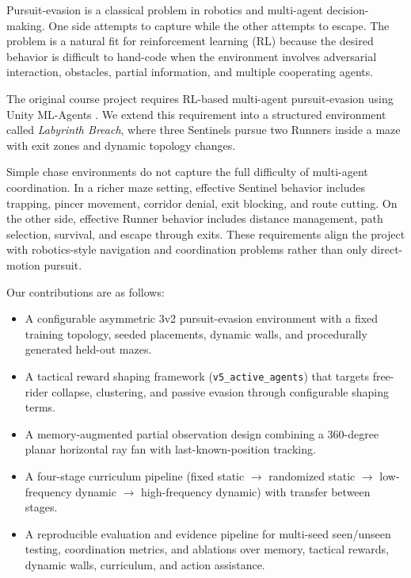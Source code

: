 \documentclass[journal]{IEEEtran}
\begin{document}
Pursuit-evasion is a classical problem in robotics and multi-agent decision-making. One side attempts to capture while the other attempts to escape. The problem is a natural fit for reinforcement learning (RL) because the desired behavior is difficult to hand-code when the environment involves adversarial interaction, obstacles, partial information, and multiple cooperating agents.

The original course project requires RL-based multi-agent pursuit-evasion using Unity ML-Agents \cite{ai641projectdoc}. We extend this requirement into a structured environment called \textit{Labyrinth Breach}, where three Sentinels pursue two Runners inside a maze with exit zones and dynamic topology changes.

Simple chase environments do not capture the full difficulty of multi-agent coordination. In a richer maze setting, effective Sentinel behavior includes trapping, pincer movement, corridor denial, exit blocking, and route cutting. On the other side, effective Runner behavior includes distance management, path selection, survival, and escape through exits. These requirements align the project with robotics-style navigation and coordination problems rather than only direct-motion pursuit.

Our contributions are as follows:
\begin{itemize}
    \item A configurable asymmetric 3v2 pursuit-evasion environment with a fixed training topology, seeded placements, dynamic walls, and procedurally generated held-out mazes.
    \item A tactical reward shaping framework (\texttt{v5\_active\_agents}) that targets free-rider collapse, clustering, and passive evasion through configurable shaping terms.
    \item A memory-augmented partial observation design combining a 360-degree planar horizontal ray fan with last-known-position tracking.
    \item A four-stage curriculum pipeline (fixed static $\to$ randomized static $\to$ low-frequency dynamic $\to$ high-frequency dynamic) with transfer between stages.
    \item A reproducible evaluation and evidence pipeline for multi-seed seen/unseen testing, coordination metrics, and ablations over memory, tactical rewards, dynamic walls, curriculum, and action assistance.
\end{itemize}
\end{document}
